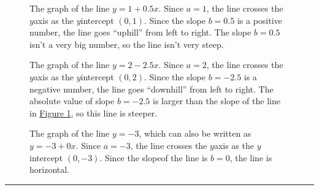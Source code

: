 \documentclass[letterpaper,10pt,english]{jupyterBook}
\begin{document}
\begin{figure}[htbp]
\centering
\capstart

\noindent{}
\caption{The graph of the line \(y = 1 + 0.5x\). Since \(a = 1\), the line crosses the \(y\)\sphinxhyphen{}axis as the \(y\)\sphinxhyphen{}intercept \((0, 1)\). Since the slope \(b = 0.5\) is a positive number, the line goes “uphill” from left to right. The slope \(b = 0.5\) isn’t a very big number, so the line isn’t very steep.}\label{\detokenize{Ch8 Correlation and Linear Regression/8.2 Linear Equations:line1}}\end{figure}

\begin{figure}[htbp]
\centering
\capstart

\noindent{}
\caption{The graph of the line \(y = 2 - 2.5x\). Since \(a = 2\), the line crosses the \(y\)\sphinxhyphen{}axis as the \(y\)\sphinxhyphen{}intercept \((0, 2)\). Since the slope \(b = -2.5\) is a negative number, the line goes “downhill” from left to right. The absolute value of slope \(b = -2.5\) is larger than the slope of the line in \hyperref[\detokenize{Ch8 Correlation and Linear Regression/8.2 Linear Equations:line1}]{Figure \ref{\detokenize{Ch8 Correlation and Linear Regression/8.2 Linear Equations:line1}}}, so this line is steeper.}\label{\detokenize{Ch8 Correlation and Linear Regression/8.2 Linear Equations:line2}}\end{figure}

\begin{figure}[htbp]
\centering
\capstart

\noindent{}
\caption{The graph of the line \(y = -3\), which can also be written as \(y = -3 + 0x\). Since \(a = -3\), the line crosses the \(y\)\sphinxhyphen{}axis as the \(y\)\sphinxhyphen{}intercept \((0, -3)\). Since the slopeof the line is \(b = 0\), the line is horizontal.}\label{\detokenize{Ch8 Correlation and Linear Regression/8.2 Linear Equations:line3}}\end{figure}


\bigskip\hrule\bigskip
\end{document}
